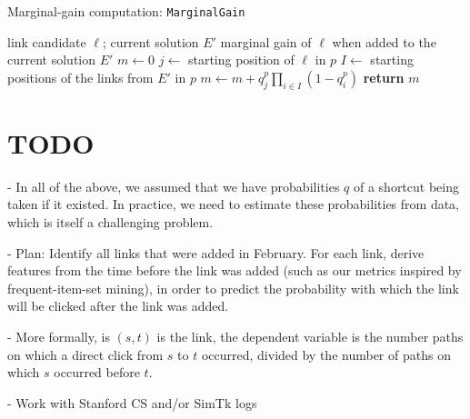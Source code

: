 \documentclass[11pt,letterpaper]{article}
\begin{document}
\begin{algorithm}[t]
\caption{Marginal-gain computation: \texttt{MarginalGain}}
\begin{algorithmic}[1]
\label{alg:marginal_gain}
\INPUT link candidate $\ell$; current solution $E'$
\OUTPUT marginal gain of $\ell$ when added to the current solution $E'$
\STATE $m \leftarrow 0$
  \STATE $j \leftarrow$ starting position of $\ell$ in $p$
  \STATE $I \leftarrow$ starting positions of the links from $E'$ in $p$
  \STATE $m \leftarrow m + q^p_j \prod_{i \in I} (1 - q^p_i)$
\ENDFOR
\STATE \textbf{return} $m$
\end{algorithmic}
\end{algorithm}


\section{TODO}

- In all of the above, we assumed that we have probabilities $q$ of a shortcut being taken if it existed.
In practice, we need to estimate these probabilities from data, which is itself a challenging problem.

- Plan: Identify all links that were added in February. For each link, derive features from the time before the link was added (such as our metrics inspired by frequent-item-set mining), in order to predict the probability with which the link will be clicked after the link was added.

- More formally, is $(s,t)$ is the link, the dependent variable is the number paths on which a direct click from $s$ to $t$ occurred, divided by the number of paths on which $s$ occurred before $t$.

- Work with Stanford CS and/or SimTk logs
\end{document}
